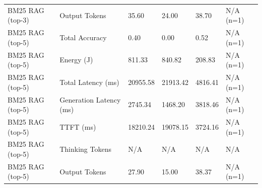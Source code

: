 \begin{table}
\begin{tabular}{llllll}
BM25 RAG (top-3) & Output Tokens & 35.60 & 24.00 & 38.70 & N/A (n=1) \\
BM25 RAG (top-5) & Total Accuracy & 0.40 & 0.00 & 0.52 & N/A (n=1) \\
BM25 RAG (top-5) & Energy (J) & 811.33 & 840.82 & 208.83 & N/A (n=1) \\
BM25 RAG (top-5) & Total Latency (ms) & 20955.58 & 21913.42 & 4816.41 & N/A (n=1) \\
BM25 RAG (top-5) & Generation Latency (ms) & 2745.34 & 1468.20 & 3818.46 & N/A (n=1) \\
BM25 RAG (top-5) & TTFT (ms) & 18210.24 & 19078.15 & 3724.16 & N/A (n=1) \\
BM25 RAG (top-5) & Thinking Tokens & N/A & N/A & N/A & N/A \\
BM25 RAG (top-5) & Output Tokens & 27.90 & 15.00 & 38.37 & N/A (n=1) \\
\bottomrule
\end{tabular}
\end{table}

